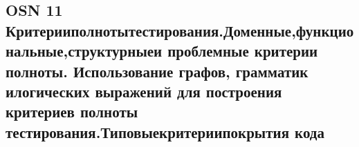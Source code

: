 \subsection{OSN 11 Критерииполнотытестирования.Доменные,функциональные,структурныеи
проблемные критерии полноты. Использование графов, грамматик
илогических выражений для построения критериев полноты
тестирования.Типовыекритериипокрытия кода}
